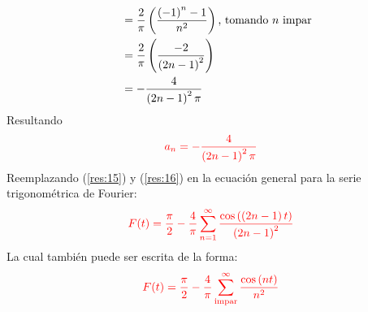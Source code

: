 \begin{multicols}{2}
\begin{align*}
    \hphantom{a_0} &= \frac{2}{\pi} \left(\frac{\left(-1\right)^n - 1}{n^{2}}\right) \textup{, tomando $n$ impar}\\
    &= \frac{2}{\pi} \left(\frac{-2}{\left(2n-1\right)^{2}}\right)\\
    &= -\frac{4}{\left(2n-1\right)^{2} \pi}
\end{align*}
Resultando
\begin{equation}
    \textcolor{rojo}{a_n = -\frac{4}{\left(2n-1\right)^{2} \pi}}
    \label{res:16}
\end{equation}
Reemplazando (\ref{res:15}) y (\ref{res:16}) en la ecuación general para la serie trigonométrica de Fourier:
\begin{equation}
    \textcolor{rojo}{F(t) = \frac{\pi}{2} - \frac{4}{\pi} \sum_{n = 1}^{\infty} \frac{\cos\left(\left(2n-1\right)t\right)}{\left(2n-1\right)^2}}
    \label{res:17.1}
\end{equation}
La cual también puede ser escrita de la forma:
\begin{equation}
    \textcolor{rojo}{F(t) = \frac{\pi}{2} - \frac{4}{\pi} \sum_{\mathrm{impar}}^{\infty} \frac{\cos\left(nt\right)}{n^2}}
    \label{res:17.2}
\end{equation}

\end{multicols}


